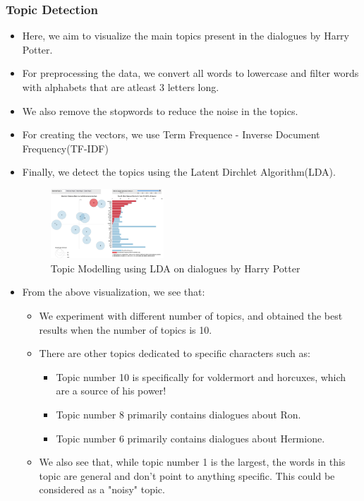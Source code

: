 \documentclass[a4paper]{article}
\begin{document}
\subsubsection{Topic Detection}
\begin{itemize}
    \item Here, we aim to visualize the main topics present in the dialogues by Harry Potter.
    \item For preprocessing the data, we convert all words to lowercase and filter words with alphabets that are atleast 3 letters long.
    \item We also remove the stopwords to reduce the noise in the topics.
    \item For creating the vectors, we use Term Frequence - Inverse Document Frequency(TF-IDF)
    \item Finally, we detect the topics using the Latent Dirchlet Algorithm(LDA).
    \begin{figure}[H]
        \centering
        \includegraphics[width=0.4\textwidth]{topic}
        \caption{Topic Modelling using LDA on dialogues by Harry Potter}
        \label{fig:topic}
    \end{figure}
    \item From the above visualization, we see that:
    \begin{itemize}
        \item We experiment with different number of topics, and obtained the best results when the number of topics is 10.
        \item There are other topics dedicated to specific characters such as:
        \begin{itemize}
            \item Topic number 10 is specifically for voldermort and horcuxes, which are a source of his power!
            \item Topic number 8 primarily contains dialogues about Ron.
            \item Topic number 6 primarily contains dialogues about Hermione.
        \end{itemize}
        \item We also see that, while topic number 1 is the largest, the words in this topic are general and don't point to anything specific. This could be considered as a "noisy" topic.

\end{itemize}
\end{itemize}
\end{document}
